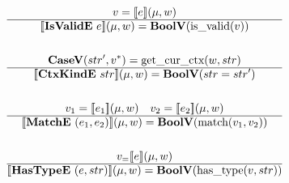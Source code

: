 \begin{gather*}
  v = \sem{e}(\mu, w) \\
  \hline
  \sem{\isvalide ~ e}(\mu, w) = \boolv (\isvalid(v)) \\
%
\newline \\
  \casev (str', \seq v) = \getcurctx(w, str) \\
  \hline
  \sem{\ctxkinde ~ str}(\mu, w) = \boolv (str = str') \\
%
\newline \\
  v_1 = \sem{e_1}(\mu, w) \quad
  v_2 = \sem{e_2}(\mu, w) \\
  \hline
  \sem{\matche ~ (e_1, e_2)}(\mu, w) = \boolv (\match(v_1, v_2)) \\
%
\newline \\
  v_= \sem{e}(\mu, w) \\
  \hline
  \sem{\hastypee ~ (e, str)}(\mu, w) = \boolv (\hastype(v, str)) \\
\end{gather*}





